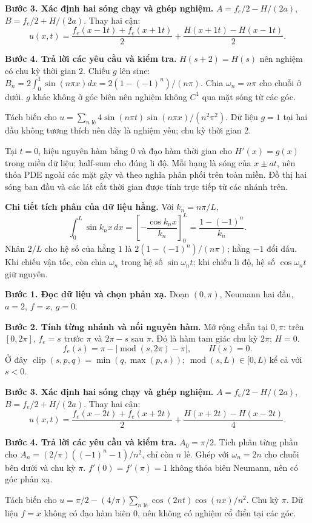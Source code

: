 \textbf{Bước 3. Xác định hai sóng chạy và ghép nghiệm.} $A=f_e/2-H/(2a)$, $B=f_e/2+H/(2a)$. Thay hai cận:
\[u(x,t)=\frac{f_e(x-1t)+f_e(x+1t)}2+\frac{H(x+1t)-H(x-1t)}{2}.\]

\textbf{Bước 4. Trả lời các yêu cầu và kiểm tra.} $H(s+2)=H(s)$ nên nghiệm có chu kỳ thời gian $2$. Chiếu $g$ lên sine: $B_n=2\int_0^1\sin(n\pi x)dx=2(1-(-1)^n)/(n\pi)$. Chia $\omega_n=n\pi$ cho chuỗi ở dưới. $g$ khác không ở góc biên nên nghiệm không $C^1$ qua mặt sóng từ các góc.

Tách biến cho $u=\sum_{n\text{ lẻ}}4\sin(n\pi t)\sin(n\pi x)/(n^2\pi^2)$. Dữ liệu $g=1$ tại hai đầu không tương thích nên đây là nghiệm yếu; chu kỳ thời gian 2.

Tại $t=0$, hiệu nguyên hàm bằng $0$ và đạo hàm thời gian cho $H'(x)=g(x)$ trong miền dữ liệu; half-sum cho đúng li độ. Mỗi hạng là sóng của $x\pm at$, nên thỏa PDE ngoài các mặt gãy và theo nghĩa phân phối trên toàn miền. Đồ thị hai sóng ban đầu và các lát cắt thời gian được tính trực tiếp từ các nhánh trên.

\textbf{Chi tiết tích phân của dữ liệu hằng.} Với $k_n=n\pi/L$,
\[\int_0^L\sin k_nx\,dx=\left[-\frac{\cos k_nx}{k_n}\right]_0^L=\frac{1-(-1)^n}{k_n}.\]
Nhân $2/L$ cho hệ số của hằng $1$ là $2(1-(-1)^n)/(n\pi)$; hằng $-1$ đổi dấu. Khi chiếu vận tốc, còn chia $\omega_n$ trong hệ số $\sin\omega_nt$; khi chiếu li độ, hệ số $\cos\omega_nt$ giữ nguyên.

\textbf{Bước 1. Đọc dữ liệu và chọn phản xạ.} Đoạn $(0,\pi)$, Neumann hai đầu, $a=2$, $f=x$, $g=0$.

\textbf{Bước 2. Tính từng nhánh và nối nguyên hàm.} Mở rộng chẵn tại $0,\pi$: trên $[0,2\pi]$, $f_e=s$ trước $\pi$ và $2\pi-s$ sau $\pi$. Đó là hàm tam giác chu kỳ $2\pi$; $H=0$.
\[f_e(s)=\pi-|\operatorname{mod}(s,2\pi)-\pi|,\qquad H(s)=0.\]
Ở đây $\operatorname{clip}(s,p,q)=\min(q,\max(p,s))$; $\operatorname{mod}(s,L)\in[0,L)$ kể cả với $s<0$.

\textbf{Bước 3. Xác định hai sóng chạy và ghép nghiệm.} $A=f_e/2-H/(2a)$, $B=f_e/2+H/(2a)$. Thay hai cận:
\[u(x,t)=\frac{f_e(x-2t)+f_e(x+2t)}2+\frac{H(x+2t)-H(x-2t)}{4}.\]

\textbf{Bước 4. Trả lời các yêu cầu và kiểm tra.} $A_0=\pi/2$. Tích phân từng phần cho $A_n=(2/\pi)((-1)^n-1)/n^2$, chỉ còn $n$ lẻ. Ghép với $\omega_n=2n$ cho chuỗi bên dưới và chu kỳ $\pi$. $f'(0)=f'(\pi)=1$ không thỏa biên Neumann, nên có góc phản xạ.

Tách biến cho $u=\pi/2-(4/\pi)\sum_{n\text{ lẻ}}\cos(2nt)\cos(nx)/n^2$. Chu kỳ $\pi$. Dữ liệu $f=x$ không có đạo hàm biên 0, nên không có nghiệm cổ điển tại các góc.

